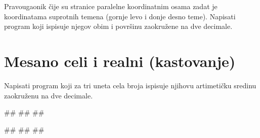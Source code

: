 \begin{Exercise}[label=p1_13] 
Pravougaonik čije su stranice paralelne koordinatnim osama zadat je koordinatama suprotnih temena (gornje levo i donje desno teme). Napisati program koji ispisuje njegov obim i površinu zaokružene na dve decimale. 

\end{Exercise}
\begin{Answer}[ref=p1_13]
\end{Answer}

\section{Mesano celi i realni (kastovanje)}

\begin{Exercise}[label=v1.1_09] 
Napisati program koji za tri uneta cela broja ispisuje njihovu artimetičku sredinu zaokruženu na dve decimale.\\
\begin{miditest}
\begin{upotreba}{1}
#\naslovInt#
##
##
\end{upotreba}
\end{miditest}
\begin{miditest}
\begin{upotreba}{2}
#\naslovInt#
##
##
\end{upotreba}
\end{miditest}

\end{Exercise}
\begin{Answer}[ref=v1.1_09]
\end{Answer}







